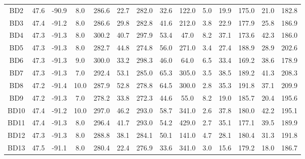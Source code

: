 \begin{sidewaystable}
\begin{tabular}{cccccccccccccc}
BD2              & 47.6 & -90.9 & 8.0  & 286.6   & 22.7         & 282.0   & 32.6    & 122.0 & 5.0                     & 19.9        & 175.0       & 21.0         & 182.8        \\
BD3              & 47.4 & -91.2 & 8.0  & 286.6   & 29.8         & 282.8   & 41.6    & 212.0 & 3.8                     & 22.9        & 177.9       & 25.8         & 186.9        \\
BD4              & 47.3 & -91.3 & 8.0  & 300.2   & 40.7         & 297.9   & 53.4    & 47.0  & 8.2                     & 37.1        & 173.6       & 42.3         & 186.0        \\
BD5              & 47.3 & -91.3 & 8.0  & 282.7   & 44.8         & 274.8   & 56.0    & 271.0 & 3.4                     & 27.4        & 188.9       & 28.9         & 202.6        \\
BD6              & 47.3 & -91.3 & 9.0  & 300.0   & 33.2         & 298.3   & 46.0    & 64.0  & 6.5                     & 33.4        & 169.2       & 38.6         & 178.9        \\
BD7              & 47.3 & -91.3 & 7.0  & 292.4   & 53.1         & 285.0   & 65.3    & 305.0 & 3.5                     & 38.5        & 189.2       & 41.3         & 208.3        \\
BD8              & 47.2 & -91.4 & 10.0 & 287.9   & 52.8         & 278.8   & 64.5    & 300.0 & 2.8                     & 35.3        & 191.8       & 37.1         & 209.9        \\
BD9              & 47.2 & -91.3 & 7.0  & 278.2   & 33.8         & 272.3   & 44.6    & 55.0  & 8.2                     & 19.0        & 185.7       & 20.4         & 195.6        \\
BD10             & 47.4 & -91.2 & 10.0 & 297.0   & 46.2         & 293.0   & 58.7    & 341.0 & 2.6                     & 37.8        & 180.0       & 42.2         & 195.1        \\
BD11             & 47.4 & -91.3 & 8.0  & 296.4   & 41.7         & 293.0   & 54.2    & 429.0 & 2.7                     & 35.1        & 177.1       & 39.5         & 189.9        \\
BD12             & 47.3 & -91.3 & 8.0  & 288.8   & 38.1         & 284.1   & 50.1    & 141.0 & 4.7                     & 28.1        & 180.4       & 31.3         & 191.8        \\
BD13             & 47.5 & -91.1 & 8.0  & 280.4   & 22.4         & 276.9   & 33.6    & 341.0 & 3.0                     & 15.6        & 179.2       & 18.0         & 186.7        \\

\end{tabular}
\end{sidewaystable}
